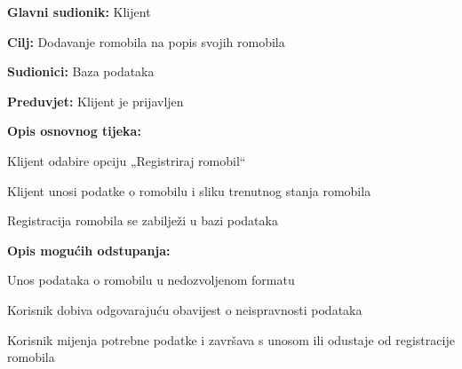 						\noindent {}
						\begin{packed_item}
							
							\item \textbf{Glavni sudionik: }Klijent
							\item  \textbf{Cilj: }Dodavanje romobila na popis svojih romobila
							\item  \textbf{Sudionici: }Baza podataka
							\item  \textbf{Preduvjet: }Klijent je prijavljen
							\item  \textbf{Opis osnovnog tijeka:}
							
							\item[] \begin{packed_enum}
								
								\item Klijent odabire opciju „Registriraj romobil“ 
								\item Klijent unosi podatke o romobilu i sliku trenutnog stanja romobila 
								\item Registracija romobila se zabilježi u bazi podataka 
								  
							\end{packed_enum}
							
							\item  \textbf{Opis mogućih odstupanja:}
							
							\item[] \begin{packed_item}
								
								\item[2.a] Unos podataka o romobilu u nedozvoljenom formatu 
								\item[] \begin{packed_enum}
									
									\item Korisnik dobiva odgovarajuću obavijest o neispravnosti podataka 
									\item Korisnik mijenja potrebne podatke i završava s unosom ili odustaje od registracije romobila 
									
								\end{packed_enum}
								
								
							\end{packed_item}
						\end{packed_item}
						\noindent {}
